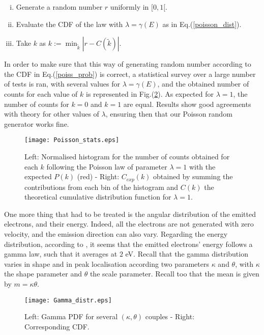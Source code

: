 \begin{enumerate}[i)]
\item{Generate a random number $r$ uniformly  in $[0,1[. $}
\item{Evaluate the CDF of the law with $\lambda = \gamma(E)$ as in Eq.(\ref{poisson_dist}).}
\item{Take $k$ as $k := \min_{\tilde{k}} |r-C(\tilde{k})|$}.
\end{enumerate}

\noindent In order to make sure that this way of generating random number according to the CDF in Eq.(\ref{poiss_prob}) is correct, a statistical survey over a large number of tests is ran, with several values for $\lambda = \gamma(E)$, and the obtained number of counts for each value of $k$ is represented in Fig.(\ref{Poisson_stat}). As expected for $\lambda=1$, the number of counts for $k=0$ and $k=1$ are equal. Results show good agreements with theory for other values of $\lambda$, ensuring then that our Poisson random generator works fine. \\

\begin{figure}[h!]
\centering
	\texttt{[image: Poisson\_stats.eps]}
	\caption{\label{Poisson_stat} Left: Normalised histogram for the number of counts obtained for each $k$ following the Poisson law of parameter $\lambda = 1$ with the expected $P(k)$ (red) - Right: $C_{exp}(k)$ obtained by summing the contributions from each bin of the histogram and $C(k)$ the theoretical cumulative distribution function for $\lambda = 1$. }
\end{figure}  

One more thing that had to be treated is the angular distribution of the emitted electrons, and their energy. Indeed, all the electrons are not generated with zero velocity, and the emission direction can also vary.  Regarding the energy distribution, according to \cite{HasselII, Pagonakis}, it seems that the emitted electrons' energy follows a gamma law, such that it averages at $2$ eV. Recall that the gamma distribution varies in shape and in peak localisation according two parameters $\kappa$ and $\theta$, with $\kappa$ the shape parameter and $\theta$ the scale parameter. Recall too that the mean is given by $m=\kappa \theta$. 

\begin{figure}[h!]
\centering
	\texttt{[image: Gamma\_distr.eps]}
	\caption{\label{Poisson_stat} Left: Gamma PDF for several $(\kappa, \theta)$ couples - Right: Corresponding CDF. }
\end{figure}  

